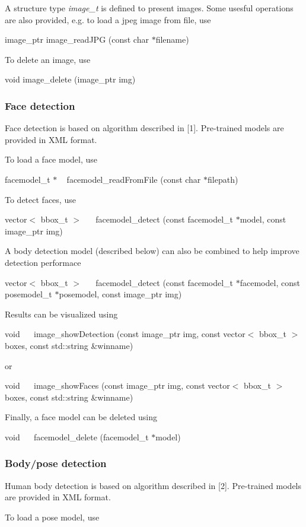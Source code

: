A structure type {\itshape image\-\_\-t} is defined to present images. Some usesful operations are also provided, e.\-g. to load a jpeg image from file, use 

 image\-\_\-ptr image\-\_\-read\-J\-P\-G (const char $\ast$filename)

 To delete an image, use 

 void image\-\_\-delete (image\-\_\-ptr img)\subsubsection*{Face detection}

 

Face detection is based on algorithm described in \mbox{[}1\mbox{]}. Pre-\/trained models are provided in X\-M\-L format. \par
 To load a face model, use 

 facemodel\-\_\-t $\ast$ ~ facemodel\-\_\-read\-From\-File (const char $\ast$filepath)

 To detect faces, use 

 vector$<$ bbox\-\_\-t $>$ ~ ~facemodel\-\_\-detect (const facemodel\-\_\-t $\ast$model, const image\-\_\-ptr img)

 A body detection model (described below) can also be combined to help improve detection performace 

 vector$<$ bbox\-\_\-t $>$ ~ ~facemodel\-\_\-detect (const facemodel\-\_\-t $\ast$facemodel, const posemodel\-\_\-t $\ast$posemodel, const image\-\_\-ptr img)

 Results can be visualized using 

 void ~ ~image\-\_\-show\-Detection (const image\-\_\-ptr img, const vector$<$ bbox\-\_\-t $>$ boxes, const std\-:\-:string \&winname)

 or 

 void ~ ~image\-\_\-show\-Faces (const image\-\_\-ptr img, const vector$<$ bbox\-\_\-t $>$ boxes, const std\-:\-:string \&winname)

 Finally, a face model can be deleted using \par
 

 void ~ ~facemodel\-\_\-delete (facemodel\-\_\-t $\ast$model)\subsubsection*{Body/pose detection}

 

Human body detection is based on algorithm described in \mbox{[}2\mbox{]}. Pre-\/trained models are provided in X\-M\-L format. \par
 To load a pose model, use 

